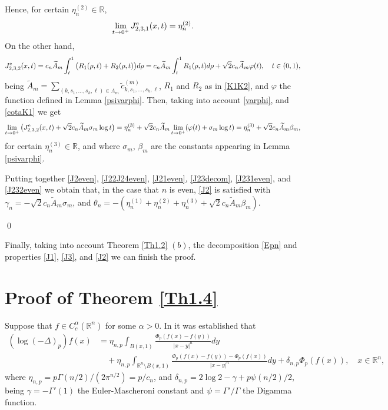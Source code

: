 \documentclass[a4paper,10pt, reqno]{amsart}
\theoremstyle{definition}
\theoremstyle{remark}
\numberwithin{equation}{section}
\begin{document}
{$$$$
Hence, for certain $\eta_n^{(2)}\in \mathbb R$, 
\begin{equation}\label{J231even}
\lim_{t\rightarrow 0^+}J_{2,3,1}^{\rm e}(x,t)=\eta_n^{(2)}.
\end{equation}
On the other hand,
$$
J_{2,3,2}^{\rm e}(x,t)=c_n\widetilde{A}_m\int_t^1\big(R_1(\rho, t)+R_2(\rho ,t)\big)d\rho=c_n\widetilde{A}_m\int_t^1R_1(\rho, t)d\rho +\sqrt{2}c_n\widetilde{A}_m\varphi (t),\quad t\in (0,1),
$$
being $\widetilde{A}_m=\sum_{(k,s_1,\ldots,s_k,\ell)\in \Lambda_m}\widetilde{c}_{k,s_1,\ldots, s_k,\ell}^{(m)}$, $R_1$ and $R_2$ as in \eqref{K1K2}, and $\varphi$ the function defined in Lemma \ref{psivarphi}. Then, taking into account \eqref{varphi}, and \eqref{cotaK1} we get
\begin{equation}\label{J232even}
\lim_{t\rightarrow 0^+}\big(J_{2,3,2}^{\rm e}(x,t)+\sqrt{2}c_n\widetilde{A}_m\sigma_m\log t\big)=\eta_n^{(3)}+\sqrt{2}c_n\widetilde{A}_m\lim_{t\rightarrow 0^+}(\varphi (t)+\sigma_m\log t)=\eta_n^{(3)}+\sqrt{2}c_n\widetilde{A}_m\beta_m,
\end{equation}
for certain $\eta_n^{(3)}\in \mathbb R$, and where $\sigma _m$, $\beta_m$ are the constants appearing in Lemma \ref{psivarphi}.

Putting together \eqref{J2even}, \eqref{J22J24even}, \eqref{J21even}, \eqref{J23decom}, \eqref{J231even}, and \eqref{J232even} we obtain that, in the case that $n$ is even, \eqref{J2} is satisfied with $\gamma_n=-\sqrt{2}c_n\widetilde{A}_m\sigma _m$, and $\theta_n=-(\eta_n^{(1)}+\eta_n^{(2)}+\eta_n^{(3)}+\sqrt{2}c_n\widetilde{A}_m\beta_m)$.

\qed

Finally, taking into account Theorem \ref{Th1.2} $(b)$, the decomposition \eqref{Epn} and properties \eqref{J1}, \eqref{J3}, and \eqref{J2} we can finish the proof.

\section{Proof of Theorem \ref{Th1.4}}\label{S6}
Suppose that $f\in C_c^\alpha (\mathbb R^n)$ for some $\alpha >0$. In \cite[Theorem 1.1]{DJF} it was established that
\begin{align}\label{LogDeltap}
    (\log (-\Delta)_p)f(x)&=\eta_{n,p}\int_{B(x,1)}\frac{\Phi _p(f(x)-f(y))}{|x-y|^n}dy\nonumber\\
    &\quad +\eta_{n,p}\int_{\mathbb R^n\setminus B(x,1)}\frac{\Phi _p(f(x)-f(y))-\Phi _p(f(x))}{|x-y|^n}dy +\delta_{n,p}\Phi _p(f(x)),\quad x\in \mathbb R^n,
\end{align}
where $\eta_{n,p}=p\Gamma (n/2)/(2\pi ^{n/2})=p/c_n$, and $\delta_{n,p}=2\log 2-\gamma+p\psi (n/2)/2$, being $\gamma=-\Gamma'(1)$ the Euler-Mascheroni constant and $\psi =\Gamma '/\Gamma$ the Digamma function.

}
\end{document}
